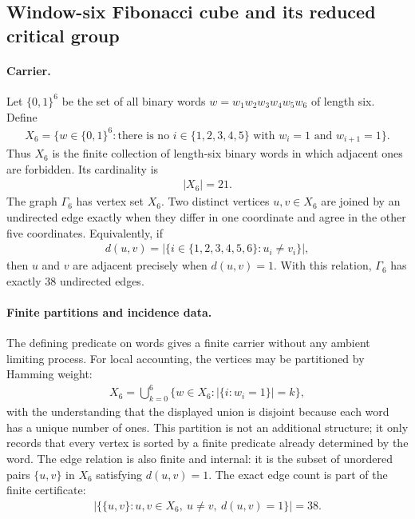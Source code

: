 
\subsection{Window-six Fibonacci cube and its reduced critical group}
\label{sec:window6-fibonacci-cube-critical-group-snf}

\paragraph{Carrier.}
Let $\{0,1\}^6$ be the set of all binary words $w=w_1w_2w_3w_4w_5w_6$ of length six. Define
$$
\begin{aligned}
X_6=\{w\in \{0,1\}^6 : \text{there is no } i\in\{1,2,3,4,5\}\text{ with }w_i=1\text{ and }w_{i+1}=1\}.
\end{aligned}
$$
Thus $X_6$ is the finite collection of length-six binary words in which adjacent ones are forbidden. Its cardinality is
$$
\begin{aligned}
|X_6|=21.
\end{aligned}
$$
The graph $\Gamma_6$ has vertex set $X_6$. Two distinct vertices $u,v\in X_6$ are joined by an undirected edge exactly when they differ in one coordinate and agree in the other five coordinates. Equivalently, if
$$
\begin{aligned}
d(u,v)=|\{i\in\{1,2,3,4,5,6\}:u_i\ne v_i\}|,
\end{aligned}
$$
then $u$ and $v$ are adjacent precisely when $d(u,v)=1$. With this relation, $\Gamma_6$ has exactly $38$ undirected edges.

\paragraph{Finite partitions and incidence data.}
The defining predicate on words gives a finite carrier without any ambient limiting process. For local accounting, the vertices may be partitioned by Hamming weight:
$$
\begin{aligned}
X_6=\bigcup_{k=0}^{6}\{w\in X_6: |\{i:w_i=1\}|=k\},
\end{aligned}
$$
with the understanding that the displayed union is disjoint because each word has a unique number of ones. This partition is not an additional structure; it only records that every vertex is sorted by a finite predicate already determined by the word. The edge relation is also finite and internal: it is the subset of unordered pairs $\{u,v\}$ in $X_6$ satisfying $d(u,v)=1$. The exact edge count is part of the finite certificate:
$$
\begin{aligned}
|\{\{u,v\}:u,v\in X_6,\ u\ne v,\ d(u,v)=1\}|=38.
\end{aligned}
$$

